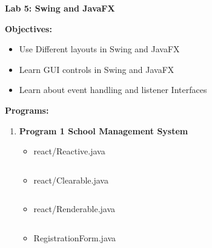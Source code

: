\documentclass{book}
\begin{document}
{\Huge \textbf{Lab 5: Swing and JavaFX}}
\\
\par
{
    \large
    \textbf{Objectives:}
    \begin{itemize}
        \item Use Different layouts in Swing and JavaFX
        \item Learn GUI controls in Swing and JavaFX
        \item Learn about event handling and listener Interfaces
    \end{itemize}

    \textbf{Programs:}
    \begin{enumerate}
        \item \textbf{Program 1 School Management System}
        \begin{itemize}
            \item react/Reactive.java
            \inputminted{java}{react/Reactive.java}
            \item react/Clearable.java
            \inputminted{java}{react/Clearable.java}
            \item react/Renderable.java
            \inputminted{java}{react/Renderable.java}
            \item RegistrationForm.java
            \inputminted{java}{RegistrationForm.java}
        
            \par


\end{itemize}
\end{enumerate}}
\end{document}
